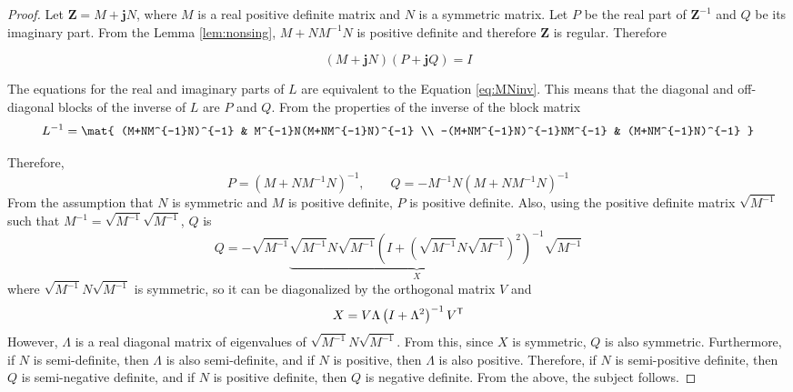 \documentclass[graybox, envcountchap]{svmult}
\begin{document}
\begin{proof}
Let $\bm{Z} = M + \bm{j} N$, where $M$ is a real positive definite matrix and
$N$ is a symmetric matrix. Let $P$ be the real part of $\bm{Z}^{-1}$ and $Q$ be
its imaginary part. From the Lemma \ref{lem:nonsing}, $M+NM^{-1}N$ is positive
definite and therefore $\bm{Z}$ is regular. Therefore

\[
  (M+ \bm{j} N)(P+ \bm{j} Q)=I
\]

The equations for the real and imaginary parts of $L$ are equivalent to the Equation \ref{eq:MNinv}.
This means that the diagonal and off-diagonal blocks of the inverse of $L$ are $P$ and $Q$.
From the properties of the inverse of the block matrix
\begin{equation*}
L^{-1}=
\mat{
(M+NM^{-1}N)^{-1} & M^{-1}N(M+NM^{-1}N)^{-1} \\
-(M+NM^{-1}N)^{-1}NM^{-1} & (M+NM^{-1}N)^{-1}
}
\end{equation*}

Therefore,
\begin{equation*}
P=(M+NM^{-1}N)^{-1},\qquad
Q=-M^{-1}N(M+NM^{-1}N)^{-1}
\end{equation*}
From the assumption that $N$ is symmetric and $M$ is positive definite, $P$ is positive definite.
Also, using the positive definite matrix $\sqrt{M^{-1}}$ such that $M^{-1}=\sqrt{M^{-1}}\sqrt{M^{-1}}$, $Q$ is
\begin{equation*}
Q=-\sqrt{M^{-1}} 
\underbrace{
\sqrt{M^{-1}} N \sqrt{M^{-1}}
\left(
I + (\sqrt{M^{-1}} N \sqrt{M^{-1}} )^2
\right)^{-1}
}_{X}
\sqrt{M^{-1}}
\end{equation*}
where $\sqrt{M^{-1}} N \sqrt{M^{-1}}$ is symmetric, so it can be diagonalized by the orthogonal matrix $V$ and
\begin{equation*}
X = V \Lambda \left(
I + \Lambda^2
\right)^{-1}
V^{\sf T}
\end{equation*}
However, $\Lambda$ is a real diagonal matrix of eigenvalues of $\sqrt{M^{-1}} N \sqrt{M^{-1}}$.
From this, since $X$ is symmetric, $Q$ is also symmetric.
Furthermore, if $N$ is semi-definite, then $\Lambda$ is also semi-definite, and if $N$ is positive, then $\Lambda$ is also positive.
Therefore, if $N$ is semi-positive definite, then $Q$ is semi-negative definite, and if $N$ is positive definite, then $Q$ is negative definite.
From the above, the subject follows.
\end{proof}
\end{document}

